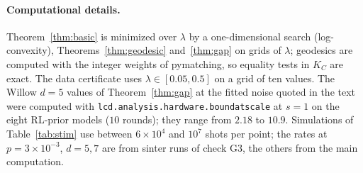 \documentclass[11pt]{article}
\theoremstyle{plain}
\theoremstyle{definition}
\theoremstyle{remark}
\newcommand{\tsc}[1]{\texttt{#1}}
\renewcommand{\_}{\oldunderscore\allowbreak}
\begin{document}
\paragraph{Computational details.} Theorem~\ref{thm:basic} is minimized over $\lambda$ by a one-dimensional search (log-convexity), Theorems~\ref{thm:geodesic} and~\ref{thm:gap} on grids of $\lambda$; geodesics are computed with the integer weights of pymatching, so equality tests in $K_C$ are exact. The data certificate uses $\lambda\in[0.05,0.5]$ on a grid of ten values. The Willow $d=5$ values of Theorem~\ref{thm:gap} at the fitted noise quoted in the text were computed with \tsc{lcd.\allowbreak analysis.\allowbreak hardware.\allowbreak bound\_at\_scale} at $s=1$ on the eight RL-prior models ($10$ rounds); they range from $2.18$ to $10.9$. Simulations of Table~\ref{tab:stim} use between $6\times10^4$ and $10^7$ shots per point; the rates at $p=3\times10^{-3}$, $d=5,7$ are from sinter runs of check G3, the others from the main computation.
\end{document}
